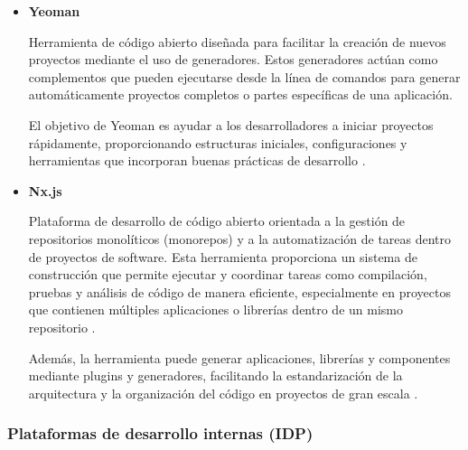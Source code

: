 \begin{itemize}

    \item \textbf{Yeoman}  
    
    Herramienta de código abierto diseñada para facilitar la creación de nuevos proyectos mediante el uso de generadores. Estos generadores actúan como complementos que pueden ejecutarse desde la línea de comandos para generar automáticamente proyectos completos o partes específicas de una aplicación. 
    
    El objetivo de Yeoman es ayudar a los desarrolladores a iniciar proyectos rápidamente, proporcionando estructuras iniciales, configuraciones y herramientas que incorporan buenas prácticas de desarrollo \citep{yeoman-2026}.

    \item \textbf{Nx.js}  
    
    Plataforma de desarrollo de código abierto orientada a la gestión de repositorios monolíticos (monorepos) y a la automatización de tareas dentro de proyectos de software. Esta herramienta proporciona un sistema de construcción que permite ejecutar y coordinar tareas como compilación, pruebas y análisis de código de manera eficiente, especialmente en proyectos que contienen múltiples aplicaciones o librerías dentro de un mismo repositorio \citep{nx-2026}.

    Además, la herramienta puede generar aplicaciones, librerías y componentes mediante plugins y generadores, facilitando la estandarización de la arquitectura y la organización del código en proyectos de gran escala \citep{nx-2026}.

\end{itemize}

\subsubsection*{Plataformas de desarrollo internas (IDP)}

